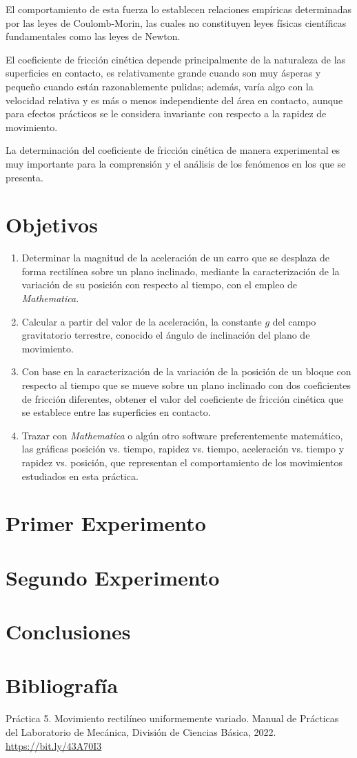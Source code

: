 \documentclass[12pt, titlepage]{report}
\begin{document}
    El comportamiento de esta fuerza lo establecen relaciones empíricas determinadas por las leyes de Coulomb-Morin, las cuales no constituyen leyes físicas científicas fundamentales como las leyes de Newton.

    El coeficiente de fricción cinética depende principalmente de la naturaleza de las superficies en contacto, es relativamente grande cuando son muy ásperas y pequeño cuando están razonablemente pulidas; además, varía algo con la velocidad relativa y es más o menos independiente del área en contacto, aunque para efectos prácticos se le considera invariante con respecto a la rapidez de movimiento.

    La determinación del coeficiente de fricción cinética de manera experimental es muy importante para la comprensión y el análisis de los fenómenos en los que se presenta. 

    \section*{Objetivos}
    \begin{enumerate}
        \item Determinar la magnitud de la aceleración de un carro que se desplaza de forma rectilínea sobre un plano inclinado, mediante la caracterización de la variación de su posición con respecto al tiempo, con el empleo de \textit{Mathematica}. 
        \item Calcular a partir del valor de la aceleración, la constante $g$ del campo gravitatorio terrestre, conocido el ángulo de inclinación del plano de movimiento. 
        \item Con base en la caracterización de la variación de la posición de un bloque con respecto al tiempo que se mueve sobre un plano inclinado con dos coeficientes de fricción diferentes, obtener el valor del coeficiente de fricción cinética que se establece entre las superficies en contacto. 
        \item Trazar con \textit{Mathematica} o algún otro software preferentemente matemático, las gráficas posición vs. tiempo, rapidez vs. tiempo, aceleración vs. tiempo y rapidez vs. posición, que representan el comportamiento de los movimientos estudiados en esta práctica. 
    \end{enumerate}

    \section*{Primer Experimento}


    \section*{Segundo Experimento}


    \newpage
    \section*{Conclusiones}

    \section*{Bibliografía}
    Práctica 5. Movimiento rectilíneo uniformemente variado. Manual de Prácticas del Laboratorio de Mecánica, División de Ciencias Básica, 2022. \url{https://bit.ly/43A70I3}
    
\end{document}
